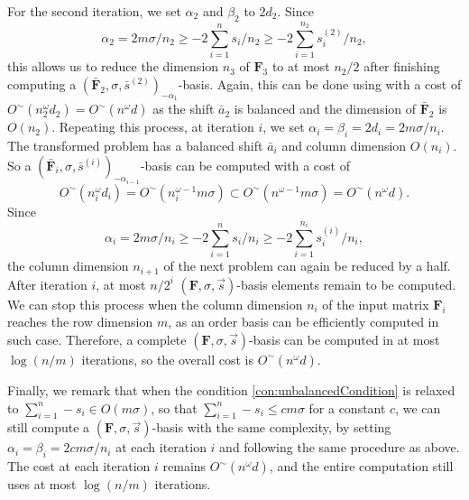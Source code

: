 \begin{pf}
For the second iteration, we set $\alpha_{2}$ and $\beta_{2}$ to
$2d_{2}$. Since \[
\alpha_{2}=2m\sigma/n_{2}\ge-2\sum_{i=1}^{n}s_{i}/n_{2}\ge-2\sum_{i=1}^{n_{2}}s_{i}^{\left(2\right)}/n_{2},\]
 this allows us to reduce the dimension $n_{3}$ of $\mathbf{F}_{3}$
to at most $n_{2}/2$ after finishing computing a $\left(\bar{\mathbf{F}}_{2},\sigma,\bar{s}^{\left(2\right)}\right)_{-\alpha_{1}}$-basis.
Again, this can be done using  with a cost of
$O^{\sim}\left(n_{2}^{\omega}d_{2}\right)=O^{\sim}\left(n^{\omega}d\right)$
as the shift $\bar{a}_{2}$ is balanced and the dimension of $\bar{\mathbf{F}}_{2}$
is $O\left(n_{2}\right)$. Repeating this process, at iteration $i$,
we set $\alpha_{i}=\beta_{i}=2d_{i}=2m\sigma/n_{i}$. The transformed
problem has a balanced shift $\bar{a}_{i}$ and column dimension $O\left(n_{i}\right)$.
So a $\left(\bar{\mathbf{F}}_{i},\sigma,\bar{s}^{\left(i\right)}\right)_{-\alpha_{i-1}}$-basis
can be computed with a cost of \[
O^{\sim}\left(n_{i}^{\omega}d_{i}\right)=O^{\sim}\left(n_{i}^{\omega-1}m\sigma\right)\subset O^{\sim}\left(n^{\omega-1}m\sigma\right)=O^{\sim}\left(n^{\omega}d\right).\]
 Since \[
\alpha_{i}=2m\sigma/n_{i}\ge-2\sum_{i=1}^{n}s_{i}/n_{i}\ge-2\sum_{i=1}^{n_{i}}s_{i}^{\left(i\right)}/n_{i},\]
 the column dimension $n_{i+1}$ of the next problem can again be
reduced by a half. After iteration $i$, at most $n/2^{i}$ $\left(\mathbf{F},\sigma,\vec{s}\right)$-basis
elements remain to be computed. We can stop this process when the
column dimension $n_{i}$ of the input matrix $\mathbf{F}_{i}$ reaches
the row dimension $m$, as an order basis can be efficiently computed
in such case. Therefore, a complete $\left(\mathbf{F},\sigma,\vec{s}\right)$-basis
can be computed in at most $\log(n/m)$ iterations, so the overall
cost is $O^{\sim}\left(n^{\omega}d\right)$. 
\end{pf}
 Finally, we remark that when the condition
\eqref{con:unbalancedCondition} is relaxed to $\sum_{i=1}^{n}-s_{i}\in O\left(m\sigma\right)$,
so that $\sum_{i=1}^{n}-s_{i}\le cm\sigma$ for a constant $c$, we
can still compute a $\left(\mathbf{F},\sigma,\vec{s}\right)$-basis
with the same complexity, by setting $\alpha_{i}=\beta_{i}=2cm\sigma/n_{i}$
at each iteration $i$ and following the same procedure as above.
The cost at each iteration $i$ remains $O^{\sim}\left(n^{\omega}d\right)$,
and the entire computation still uses at most $\log(n/m)$ iterations. 

